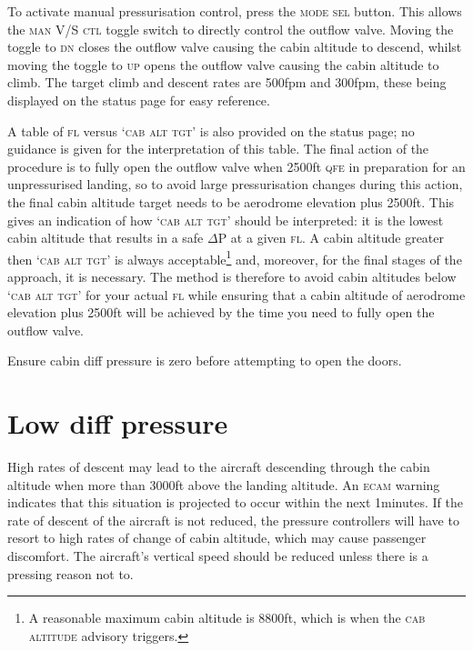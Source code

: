 \documentclass[a5paper,11pt,twoside]{book}
\newcommand{\ac}[1]{{\scshape\MakeLowercase{#1}}}
\newcommand{\inlcite}[1]{{\ac{#1}}}
\newcommand{\multicite}[1]{%
  \nopagebreak
  \noindent{{\color{blue}\footnotesize[ \inlcite{#1} ]}}
}
\begin{document}
To activate manual pressurisation control, press
the \ac{MODE} \ac{SEL} button. This
allows the \ac{MAN} V/S \ac{CTL} toggle switch to directly control the outflow
valve. Moving the toggle to \ac{DN} closes the outflow valve causing the cabin
altitude to descend, whilst moving the toggle to \ac{UP} opens the outflow valve
causing the cabin altitude to climb. The target climb and descent rates are
500fpm and 300fpm, these being displayed on the status page for easy reference.

A table of \ac{FL} versus `\ac{CAB} \ac{ALT} \ac{TGT}' is also provided on the status page; no
guidance is given for the interpretation of this table. The final action of the
procedure is to fully open the outflow valve when 2500ft \ac{QFE} in preparation for
an unpressurised landing, so to avoid large pressurisation changes during this
action, the final cabin altitude target needs to be aerodrome elevation plus
2500ft. This gives an indication of how `\ac{CAB} \ac{ALT} \ac{TGT}' should be interpreted: it
is the lowest cabin altitude that results in a safe $\Delta$P at a given \ac{FL}. A
cabin altitude greater then `\ac{CAB} \ac{ALT} \ac{TGT}' is always acceptable\footnote{A
reasonable maximum cabin altitude is 8800ft, which is when the \ac{CAB} \ac{ALTITUDE}
advisory triggers.} and, moreover, for the final stages of the approach, it is
necessary. The method is therefore to avoid cabin altitudes below `\ac{CAB} \ac{ALT} \ac{TGT}'
for your actual \ac{FL} while ensuring that a cabin altitude of aerodrome elevation
plus 2500ft will be achieved by the time you need to fully open the outflow
valve.

Ensure cabin diff pressure is zero before attempting to open the doors.

\multicite{\uline{CAB~PR}~SYS~1(2)(1+2)~FAULT, FCOM~PRO.AEP.CAB~PR}


\section{Low diff pressure}

High rates of descent may lead to the aircraft descending through the cabin
altitude when more than 3000ft above the landing altitude. An \ac{ECAM} warning
indicates that this situation is projected to occur within the next
1\textonehalf minutes. If the rate of descent of the aircraft is not reduced,
the pressure controllers will have to resort to high rates of change of cabin
altitude, which may cause passenger discomfort. The aircraft's vertical speed
should be reduced unless there is a pressing reason not to.
\end{document}
